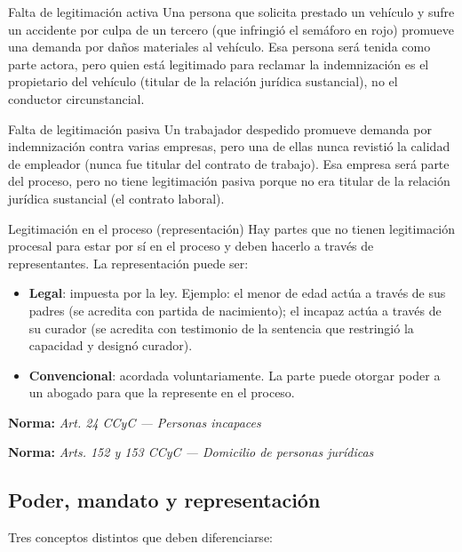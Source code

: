 \documentclass[12pt,oneside]{book}
\newcommand{\norma}[1]{%
\par\noindent\textbf{Norma:} \textit{#1}\par\smallskip
}
\begin{document}
\begin{example}{Falta de legitimación activa}
Una persona que solicita prestado un vehículo y sufre un accidente por culpa de un tercero (que infringió el semáforo en rojo) promueve una demanda por daños materiales al vehículo. Esa persona será tenida como parte actora, pero quien está legitimado para reclamar la indemnización es el propietario del vehículo (titular de la relación jurídica sustancial), no el conductor circunstancial.
\end{example}

\begin{example}{Falta de legitimación pasiva}
Un trabajador despedido promueve demanda por indemnización contra varias empresas, pero una de ellas nunca revistió la calidad de empleador (nunca fue titular del contrato de trabajo). Esa empresa será parte del proceso, pero no tiene legitimación pasiva porque no era titular de la relación jurídica sustancial (el contrato laboral).
\end{example}

\begin{definition}{Legitimación en el proceso (representación)}
Hay partes que no tienen legitimación procesal para estar por sí en el proceso y deben hacerlo a través de representantes. La representación puede ser:
\begin{itemize}
    \item \textbf{Legal}: impuesta por la ley. Ejemplo: el menor de edad actúa a través de sus padres (se acredita con partida de nacimiento); el incapaz actúa a través de su curador (se acredita con testimonio de la sentencia que restringió la capacidad y designó curador).
    \item \textbf{Convencional}: acordada voluntariamente. La parte puede otorgar poder a un abogado para que la represente en el proceso.
\end{itemize}
\end{definition}

\norma{Art. 24 CCyC --- Personas incapaces}
\norma{Arts. 152 y 153 CCyC --- Domicilio de personas jurídicas}

\subsection{Poder, mandato y representación}

Tres conceptos distintos que deben diferenciarse:
\end{document}
